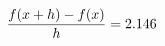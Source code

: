 \documentclass[preview]{standalone}
\begin{document}
\begin{align*}
\special{dvisvgm:raw <g id='unique000'>}\frac{f(x+h)-f(x)}{h} = 2.146\special{dvisvgm:raw </g>}
\end{align*}
\end{document}
